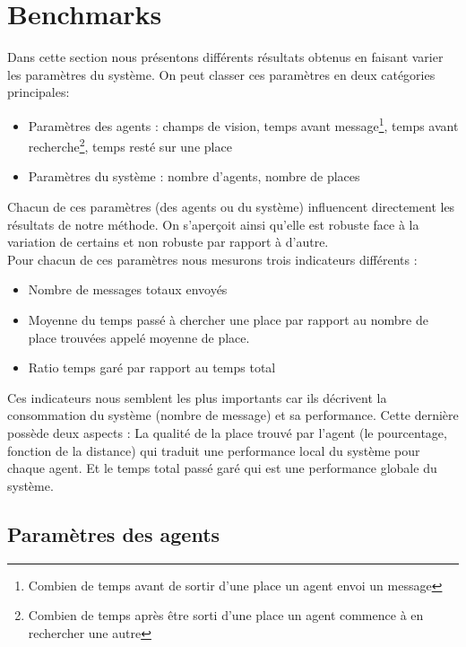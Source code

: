 \section{Benchmarks}
\label{sec:benchmarks}

Dans cette section nous présentons différents résultats obtenus en faisant varier les paramètres du système.
On peut classer ces paramètres en deux catégories principales:\\

\begin{itemize}
\item Paramètres des agents : champs de vision, temps avant message\footnote{Combien de temps avant de sortir d'une place un agent envoi un message}, temps avant recherche\footnote{Combien de temps après être sorti d'une place un agent commence à en rechercher une autre}, temps resté sur une place
\item Paramètres du système : nombre d'agents, nombre de places\\
\end{itemize}

Chacun de ces paramètres (des agents ou du système) influencent directement les résultats de notre méthode.
On s'aperçoit ainsi qu'elle est robuste face à la variation de certains et non robuste par rapport à d'autre.\\

Pour chacun de ces paramètres nous mesurons trois indicateurs différents :\\

\begin{itemize}
\item Nombre de messages totaux envoyés
\item Moyenne du temps passé à chercher une place par rapport au nombre de place trouvées appelé moyenne de place.
\item Ratio temps garé par rapport au temps total\\
\end{itemize}

Ces indicateurs nous semblent les plus importants car ils décrivent la consommation du système (nombre de message) et sa performance.
Cette dernière possède deux aspects : La qualité de la place trouvé par l'agent (le pourcentage, fonction de la distance) qui traduit une 
performance local du système pour chaque agent. Et le temps total passé garé qui est une performance globale du système.

\subsection{Paramètres des agents}


